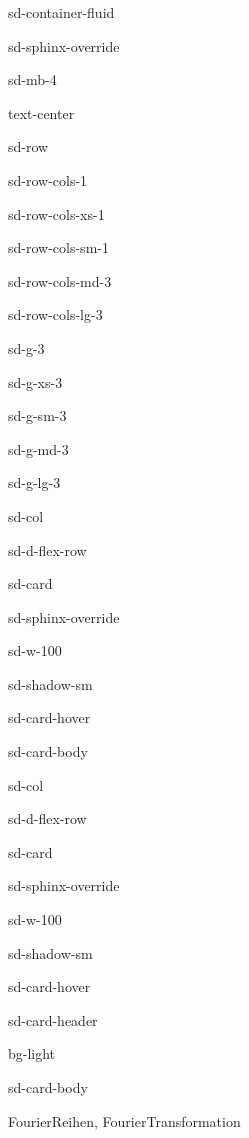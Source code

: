 \documentclass[letterpaper,10pt,english]{jupyterBook}
\let\sphinxpxdimen\pdfpxdimen\else\newdimen\sphinxpxdimen
\begin{document}
\begin{sphinxuseclass}{sd-container-fluid}
\begin{sphinxuseclass}{sd-sphinx-override}
\begin{sphinxuseclass}{sd-mb-4}
\begin{sphinxuseclass}{text-center}
\begin{sphinxuseclass}{sd-row}
\begin{sphinxuseclass}{sd-row-cols-1}
\begin{sphinxuseclass}{sd-row-cols-xs-1}
\begin{sphinxuseclass}{sd-row-cols-sm-1}
\begin{sphinxuseclass}{sd-row-cols-md-3}
\begin{sphinxuseclass}{sd-row-cols-lg-3}
\begin{sphinxuseclass}{sd-g-3}
\begin{sphinxuseclass}{sd-g-xs-3}
\begin{sphinxuseclass}{sd-g-sm-3}
\begin{sphinxuseclass}{sd-g-md-3}
\begin{sphinxuseclass}{sd-g-lg-3}
\begin{sphinxuseclass}{sd-col}
\begin{sphinxuseclass}{sd-d-flex-row}
\begin{sphinxuseclass}{sd-card}
\begin{sphinxuseclass}{sd-sphinx-override}
\begin{sphinxuseclass}{sd-w-100}
\begin{sphinxuseclass}{sd-shadow-sm}
\begin{sphinxuseclass}{sd-card-hover}
\begin{sphinxuseclass}{sd-card-body}
\end{sphinxuseclass}{\hyperref[\detokenize{content/3_Messsignale::doc}]{}}
\end{sphinxuseclass}
\end{sphinxuseclass}
\end{sphinxuseclass}
\end{sphinxuseclass}
\end{sphinxuseclass}
\end{sphinxuseclass}
\end{sphinxuseclass}
\begin{sphinxuseclass}{sd-col}
\begin{sphinxuseclass}{sd-d-flex-row}
\begin{sphinxuseclass}{sd-card}
\begin{sphinxuseclass}{sd-sphinx-override}
\begin{sphinxuseclass}{sd-w-100}
\begin{sphinxuseclass}{sd-shadow-sm}
\begin{sphinxuseclass}{sd-card-hover}
\begin{sphinxuseclass}{sd-card-header}
\begin{sphinxuseclass}{bg-light}
\sphinxAtStartPar
{}

\end{sphinxuseclass}
\end{sphinxuseclass}
\begin{sphinxuseclass}{sd-card-body}
\noindent\sphinxincludegraphics[height=120\sphinxpxdimen]{{fft}.png}

\sphinxAtStartPar
Fourier\sphinxhyphen{}Reihen, Fourier\sphinxhyphen{}Transformation


\end{sphinxuseclass}
\end{sphinxuseclass}
\end{sphinxuseclass}
\end{sphinxuseclass}
\end{sphinxuseclass}
\end{sphinxuseclass}
\end{sphinxuseclass}
\end{sphinxuseclass}
\end{sphinxuseclass}
\end{sphinxuseclass}
\end{sphinxuseclass}
\end{sphinxuseclass}
\end{sphinxuseclass}
\end{sphinxuseclass}
\end{sphinxuseclass}
\end{sphinxuseclass}
\end{sphinxuseclass}
\end{sphinxuseclass}
\end{sphinxuseclass}
\end{sphinxuseclass}
\end{sphinxuseclass}
\end{sphinxuseclass}
\end{sphinxuseclass}
\end{document}
